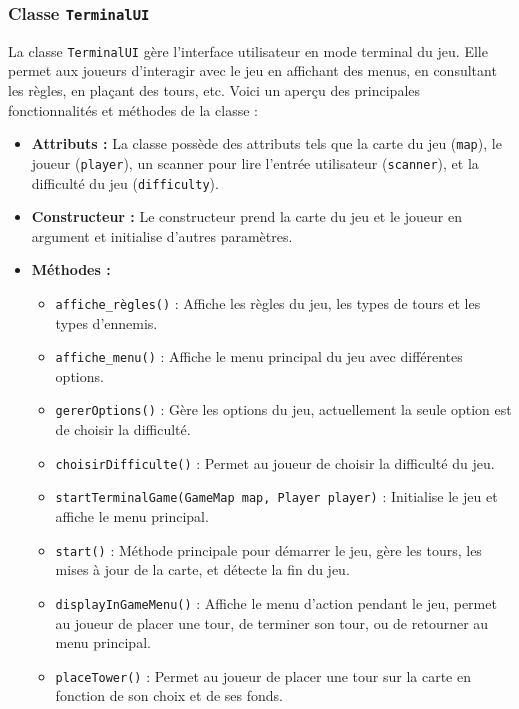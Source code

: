 \documentclass{article}
\begin{document}
\subsubsection*{Classe \texttt{TerminalUI}}
La classe \texttt{TerminalUI} gère l'interface utilisateur en mode terminal du jeu. Elle permet aux joueurs d'interagir avec le jeu en affichant des menus, en consultant les règles, en plaçant des tours, etc. Voici un aperçu des principales fonctionnalités et méthodes de la classe :

\begin{itemize}
    \item \textbf{Attributs :} La classe possède des attributs tels que la carte du jeu (\texttt{map}), le joueur (\texttt{player}), un scanner pour lire l'entrée utilisateur (\texttt{scanner}), et la difficulté du jeu (\texttt{difficulty}).

    \item \textbf{Constructeur :} Le constructeur prend la carte du jeu et le joueur en argument et initialise d'autres paramètres.

    \item \textbf{Méthodes :}
    \begin{itemize}
        \item \texttt{affiche\_règles()} : Affiche les règles du jeu, les types de tours et les types d'ennemis.
        \item \texttt{affiche\_menu()} : Affiche le menu principal du jeu avec différentes options.
        \item \texttt{gererOptions()} : Gère les options du jeu, actuellement la seule option est de choisir la difficulté.
        \item \texttt{choisirDifficulte()} : Permet au joueur de choisir la difficulté du jeu.
        \item \texttt{startTerminalGame(GameMap map, Player player)} : Initialise le jeu et affiche le menu principal.
        \item \texttt{start()} : Méthode principale pour démarrer le jeu, gère les tours, les mises à jour de la carte, et détecte la fin du jeu.
        \item \texttt{displayInGameMenu()} : Affiche le menu d'action pendant le jeu, permet au joueur de placer une tour, de terminer son tour, ou de retourner au menu principal.
        \item \texttt{placeTower()} : Permet au joueur de placer une tour sur la carte en fonction de son choix et de ses fonds.
    \end{itemize}
\end{itemize}
\end{document}
